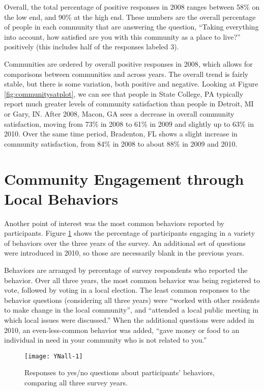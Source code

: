 \documentclass[smallextended]{svjour3}\usepackage[]{graphicx}\usepackage[]{color}
\newenvironment{knitrout}{}{} %
\begin{document}
Overall, the total percentage of positive responses in 2008 ranges between 58\% on the low end, and 90\% at the high end. These numbers are the overall percentage of people in each community that are answering the question, ``Taking everything into account, how satisfied are you with this community as a place to live?'' positively (this includes half of the responses labeled 3).

Communities are ordered by overall positive responses in 2008, which allows for comparisons between communities and across years. The overall trend is fairly stable, but there is some variation, both positive and negative. Looking at Figure \ref{fig:communitysatplot}, we can see that people in State College, PA typically report much greater levels of community satisfaction than people in Detroit, MI or Gary, IN. After 2008, Macon, GA sees a decrease in overall community satisfaction, moving from 73\% in 2008 to 61\% in 2009 and slightly up to 63\% in 2010. Over the same time period, Bradenton, FL shows a slight increase in community satisfaction, from 84\% in 2008 to about  88\% in 2009 and 2010. 

\section{Community Engagement through Local Behaviors}
\label{behaviorsec}
Another point of interest was the most common behaviors reported by participants. Figure \ref{fig:YNall} shows the percentage of participants engaging in a variety of behaviors over the three years of the survey. An additional set of questions were introduced in 2010, so those are necessarily blank in the previous years. 

Behaviors are arranged by percentage of survey respondents who reported the behavior. 
Over all three years, the most common behavior was being registered to vote, followed by voting in a local election. The least common responses to the behavior questions (considering all three years) were ``worked with other residents to make change in the local community'', and ``attended a local public meeting in which local issues were discussed.'' When the additional questions were added in 2010, an even-less-common behavior was added, ``gave money or food to an individual in need in your community who is not related to you.'' 



\begin{knitrout}
\color{fgcolor}\begin{figure}

{\centering \texttt{[image: YNall-1]} 

}

\caption[Responses to yes/no questions about participants' behaviors, comparing all three survey years]{Responses to yes/no questions about participants' behaviors, comparing all three survey years.}\label{fig:YNall}
\end{figure}


\end{knitrout}
\end{document}
